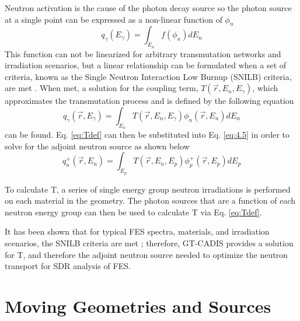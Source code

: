 Neutron activation is the cause of the photon decay source so the photon 
source at a single point can be
expressed as a non-linear function of $\phi_n$ 
\begin{equation} \label{eq:4.8}
	q_{\gamma}(E_{\gamma}) = \int_{E_n} f(\phi_{n}) dE_{n}
\end{equation}
This function can not be linearized for arbitrary transmutation networks
and irradiation scenarios, but a linear relationship can
be formulated when a set of criteria, known as the Single Neutron Interaction
Low Burnup (SNILB) criteria, are met \cite{gtcadis}.
When met, a solution for the coupling term, 
$T(\overrightarrow{r}, E_{n}, E_{\gamma})$, which approximates the
 transmutation process and is defined by the following equation
\begin{equation} \label{eq:Tdef}
	q_{\gamma}(\overrightarrow{r}, E_{\gamma}) = 
	\int_{E_n}T(\overrightarrow{r}, E_{n}, E_{\gamma})
	\phi_{n}(\overrightarrow{r}, E_{n}) dE_{n}
\end{equation}
can be found.
Eq. \ref{eq:Tdef} can then be substituted into Eq. \ref{eq:4.5} in order to 
solve for the adjoint neutron source as shown below
\begin{equation} \label{eq:gt_adj_nsrc}
	q_{n}^{+}(\overrightarrow{r},E_{n})
        = \int_{E_p}T(\overrightarrow{r}, E_{n}, E_{p})
	\phi_{p}^{+}(\overrightarrow{r}, E_{p}) dE_{p}
\end{equation}

To calculate T, a series of single energy group neutron irradiations is 
performed on each material in the geometry.  
The photon sources that are a function of each neutron energy group 
can then be used to calculate T via Eq. \ref{eq:Tdef}.

It has been shown that for typical FES spectra, materials, and irradiation
scenarios, the SNILB criteria are met \cite{gtcadis}; therefore, GT-CADIS provides a solution
for T, and therefore the adjoint neutron source needed to optimize the neutron
transport for SDR analysis of FES.


\section{Moving Geometries and Sources} \label{sec:moving_sys}

